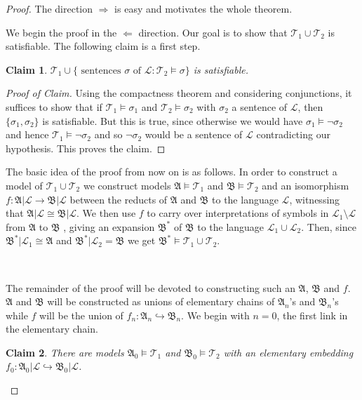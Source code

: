 \documentclass[titlepage, oneside]{amsbook}
\theoremstyle{plain}
\newtheorem*{claim}{Claim}
\theoremstyle{definition}
\theoremstyle{remark}
\newcommand{\theory}{\ensuremath{\mathcal{T}}}
\newcommand{\lan}{\ensuremath{\mathcal{L}}}
\newcommand{\ma}{\ensuremath{\mathfrak{A}}}
\newcommand{\mb}{\ensuremath{\mathfrak{B}}}
\begin{document}
\begin{proof} The direction $\Rightarrow$ is easy and motivates the whole 
theorem. 

We begin the proof in the $\Leftarrow$ direction. Our goal is to show
that $\theory_1 \cup \theory_2$ is satisfiable.
The following claim is a first step.
\begin{claim}  $\theory_1 \cup \{ \mbox{ sentences } \sigma \mbox{ of }
\lan
: \theory_2 \models \sigma \} $ is satisfiable.
\end{claim}
\begin{proof}[Proof of Claim] Using the compactness theorem and
considering
conjunctions, it suffices to show that if $\theory_1 \models \sigma_1$ and
$\theory_2 \models \sigma_2$ with $\sigma_2$ a sentence of $\lan$, then
$\{ \sigma_1 , \sigma _2 \}$ is satisfiable.  But this is true, since
otherwise we would have $\sigma_1 \models \neg \sigma_2$ and hence
$\theory_1 \models \neg \sigma_2$ and
so $\neg \sigma_2$ would be a sentence of
$\lan$ contradicting our hypothesis. This proves the claim.
\renewcommand{\qedsymbol}{}
\end{proof}

The basic idea of the proof from now on is as follows.  In order to
construct a model of $\theory_1 \cup \theory_2$ we construct models $\ma
\models \theory_1$ and $\mb \models \theory_2$
and an isomorphism \\
$f: \ma |\lan \to \mb |\lan$ between the reducts of $\ma$ and 
$\mb$ to the language $\lan$, witnessing that $\ma
|\lan \cong \mb |\lan $. We then use
$f$ to carry over
interpretations of
symbols in $\lan_1 \setminus \lan$ from $\ma $ to $\mb$ , giving an
expansion
$ \mb^{\ast} $ of $\mb$ to the language
$\lan_1 \cup \lan_2$.  Then, since $\mb^{\ast} | {\lan_1} \cong \ma$
and
$\mb^{\ast} |{\lan_2} = \mb$ we get $\mb^{\ast} \models \theory_1
\cup \theory_2$.

\

The remainder of the proof will be devoted to constructing such an
$\ma$, $\mb$ and $f$. $\ma $ and $\mb$ will be constructed as unions of
elementary chains
of $\ma_n$'s  and $\mb_n$'s while $f$ will be the union of $f_n : \ma_n
\hookrightarrow \mb_n$.
We begin with $n=0$, the first link in the elementary chain.

\begin{claim}  There are models $\ma_0 \models \theory_1$ and $\mb_0
\models \theory_2$ with an elementary embedding $f_0 : \ma_0 |\lan
\hookrightarrow \mb_0 |\lan$. \end{claim}


\end{proof}
\end{document}
